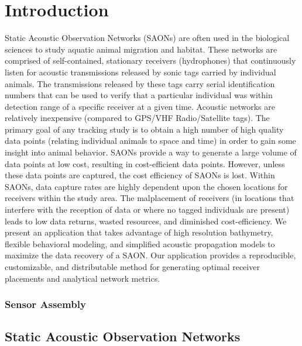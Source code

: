 \chapter{Introduction}
Static Acoustic Observation Networks (SAONs) are often used in the biological sciences to study aquatic animal migration and habitat.  These networks are comprised of self-contained, stationary receivers (hydrophones) that continuously listen for acoustic transmissions released by sonic tags carried by individual animals.  The transmissions released by these tags carry serial identification numbers that can be used to verify that a particular individual was within detection range of a specific receiver at a given time.  Acoustic networks are relatively inexpensive (compared to GPS/VHF Radio/Satellite tags).  The primary goal of any tracking study is to obtain a high number of high quality data points (relating individual animals to space and time) in order to gain some insight into animal behavior.  SAONs provide a way to generate a large volume of data points at low cost, resulting in cost-efficient data points.  However, unless these data points are captured, the cost efficiency of SAONs is lost.  Within SAONs, data capture rates are highly dependent upon the chosen locations for receivers within the study area.  The malplacement of receivers (in locations that interfere with the reception of data or where no tagged individuals are present) leads to low data returns, wasted resources, and diminished cost-efficiency.  We present an application \cite{acousitcdeploy} that takes advantage of high resolution bathymetry, flexible behavioral modeling, and simplified acoustic propagation models to maximize the data recovery of a SAON.  Our application provides a reproducible, customizable, and distributable method for generating optimal receiver placements and analytical network metrics.

\subsection{Sensor Assembly}
\section{Static Acoustic Observation Networks}

